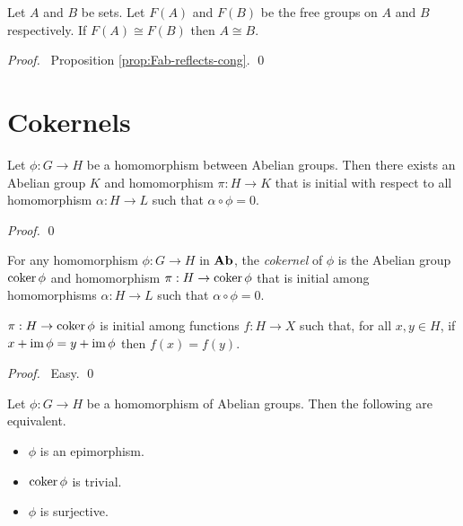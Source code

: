 \begin{cor}
Let $A$ and $B$ be sets. Let $F(A)$ and $F(B)$ be the free groups on $A$ and $B$ respectively. If $F(A) \cong F(B)$ then $A \cong B$.
\end{cor}

\begin{proof}
\pf\ Proposition \ref{prop:Fab-reflects-cong}. \qed
\end{proof}

\section{Cokernels}

\begin{prop}
Let $\phi : G \rightarrow H$ be a homomorphism between Abelian groups. Then there exists an Abelian group $K$ and homomorphism $\pi : H \rightarrow K$ that is initial with respect to all homomorphism $\alpha : H \rightarrow L$ such that $\alpha \circ \phi = 0$.
\end{prop}

\begin{proof}
\pf
{}
\qed
\end{proof}

\begin{df}[Cokernel]
For any homomorphism $\phi : G \rightarrow H$ in $\mathbf{Ab}$, the \emph{cokernel} of $\phi$ is the Abelian group $\operatorname{coker} \phi$ and homomorphism $\pi : H \rightarrow \operatorname{coker} \phi$ that is initial among homomorphisms $\alpha : H \rightarrow L$ such that $\alpha \circ \phi = 0$.
\end{df}

\begin{prop}
$\pi : H \rightarrow \operatorname{coker} \phi$ is initial among functions $f : H \rightarrow X$ such that, for all $x,y \in H$, if $x + \operatorname{im} \phi = y + \operatorname{im} \phi$ then $f(x) = f(y)$.
\end{prop}

\begin{proof}
\pf\ Easy. \qed
\end{proof}

\begin{prop}
Let $\phi : G \rightarrow H$ be a homomorphism of Abelian groups. Then the following are equivalent.
\begin{itemize}
\item $\phi$ is an epimorphism.
\item $\operatorname{coker} \phi$ is trivial.
\item $\phi$ is surjective.
\end{itemize}
\end{prop}

